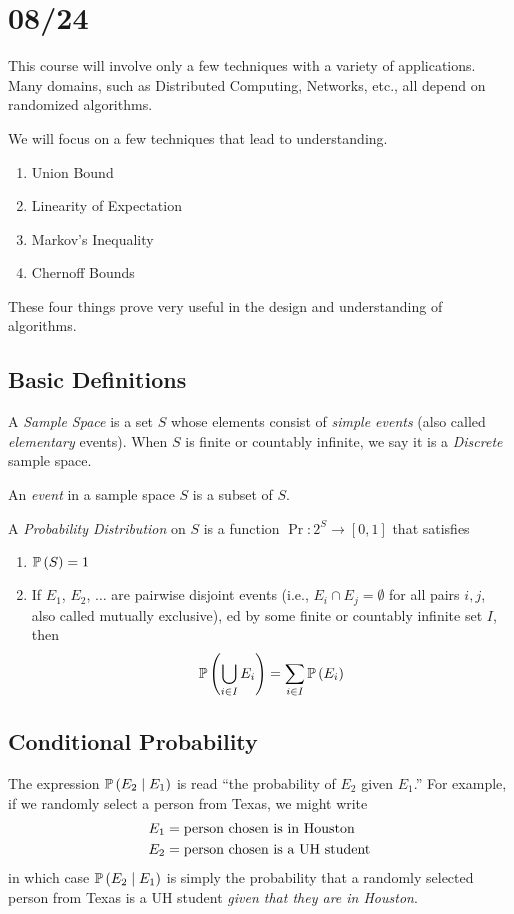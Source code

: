 \section{08/24}
This course will involve only a few techniques with a variety of applications.
Many domains, such as Distributed Computing, Networks, etc., all depend on
randomized algorithms.

We will focus on a few techniques that lead to understanding.
\begin{enumerate}
    \item Union Bound
    \item Linearity of Expectation
    \item Markov's Inequality
    \item Chernoff Bounds
\end{enumerate}
These four things prove very useful in the design and understanding of
algorithms.

\subsection{Basic Definitions}
\begin{definition}{}{}
    A \emph{Sample Space} is a set $S$ whose elements consist of \emph{simple
    events} (also called \emph{elementary} events). When $S$ is finite or
    countably infinite, we say it is a \emph{Discrete} sample space.
\end{definition}

\begin{definition}{}{}
    An \emph{event} in a sample space $S$ is a subset of $S$.
\end{definition}

\begin{definition}{}{}
    A \emph{Probability Distribution} on $S$ is a function $\Pr: 2^S \to [0, 1]$
    that satisfies
    \begin{enumerate}
        \item $\operatorname{\mathbb{P}}\left(S\right) = 1$
        \item If $E_1$, $E_2$, $\dots$ are pairwise disjoint events (i.e., $E_i
        \cap E_j = \emptyset$ for all pairs $i, j$, also called mutually
        exclusive), ed by some finite or countably infinite set $I$, then
        \[\operatorname{\mathbb{P}}\left(\bigcup_{i \in I} E_i\right) = \sum_{i \in I} \operatorname{\mathbb{P}}\left(E_i\right)\]
    \end{enumerate}
\end{definition}

\subsection{Conditional Probability}
The expression $\operatorname{\mathbb{P}}\left(E_2 \mid E_1\right)$ is read ``the probability of $E_2$ given
$E_1$.'' For example, if we randomly select a person from Texas, we might write
\begin{align*}
    E_1 &= \hbox{person chosen is in Houston}\\
    E_2 &= \hbox{person chosen is a UH student}
\end{align*}
in which case $\operatorname{\mathbb{P}}\left(E_2 \mid E_1\right)$ is simply the probability that a randomly
selected person from Texas is a UH student \emph{given that they are in
Houston}.

